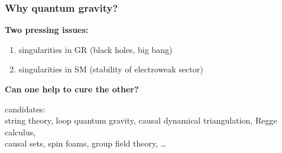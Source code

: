 \documentclass{beamer}
\begin{document}
\begin{frame}
  \frametitle{Why quantum gravity?}
  \textbf{Two pressing issues:}
  \begin{enumerate}
    \item singularities in GR (black holes, big bang)
      \hspace{2cm}
    \item singularities in SM (stability of electroweak sector)
      \hspace{1cm}
  \end{enumerate}
  \vfill
  \begin{center}
    \fontsize{12pt}{7.2}\selectfont
    \textbf{ Can one help to cure the other? }
  \end{center}
  \pause
  \begin{center}
    candidates:\\[5pt]
    string theory, loop quantum gravity, causal dynamical triangulation, Regge calculus,\\
    causal sets, spin foams, group field theory, \dots
  \end{center}
\end{frame}
\end{document}
